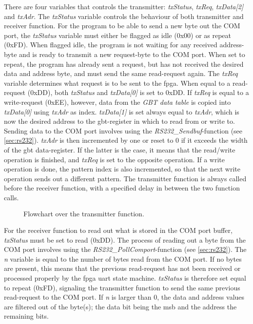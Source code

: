 \documentclass[main.tex]{subfiles}
\begin{document}
There are four variables that controls the transmitter: \textit{txStatus}, \textit{txReq}, \textit{txData[2]} and \textit{txAdr}. The \textit{txStatus} variable controls the behaviour of both transmitter and receiver function. For the program to be able to send a new byte out the COM port, the \textit{txStatus} variable must either be flagged as idle (0x00) or as repeat (0xFD). When flagged idle, the program is not waiting for any received address-byte and is ready to transmit a new request-byte to the COM port. When set to repeat, the program has already sent a request, but has not received the desired data and address byte, and must send the same read-request again. The \textit{txReq} variable determines what request is to be sent to the \gls{fpga}. When equal to a read-request (0xDD), both \textit{txStatus} and \textit{txData[0]} is set to 0xDD. If \textit{txReq} is equal to a write-request (0xEE), however, data from the \textit{GBT data table} is copied into \textit{txData[0]} using \textit{txAdr} as index. \textit{txData[1]} is set always equal to \textit{txAdr}, which is now the desired address to the \gls{gbt}-register in which to read from or write to. Sending data to the COM port involves using the \textit{RS232\_Sendbuf}-function (see \ref{sec:rs232}). \textit{txAdr} is then incremented by one or reset to 0 if it exceeds the width of the \gls{gbt} data-register. If the latter is the case, it means that the read/write operation is finished, and \textit{txReq} is set to the opposite operation. If a write operation is done, the pattern index is also incremented, so that the next write operation sends out a different pattern. The transmitter function is always called before the receiver function, with a specified delay in between the two function calls. \\

\begin{figure}[H] %
\begin{center}
\resizebox{0.8\linewidth}{!}{}
\caption{Flowchart over the transmitter function.}
\label{fig:flowtx}
\end{center}
\end{figure}

For the receiver function to read out what is stored in the COM port buffer, \textit{txStatus} must be set to read (0xDD). The process of reading out a byte from the COM port involves using the \textit{RS232\_PollComport}-function (see \ref{sec:rs232}). The \textit{n} variable is equal to the number of bytes read from the COM port. If no bytes are present, this means that the previous read-request has not been received or processed properly by the \gls{fpga} \gls{uart} state machine. \textit{txStatus} is therefore set equal to repeat (0xFD), signaling the transmitter function to send the same previous read-request to the COM port. If \textit{n} is larger than 0, the data and address values are filtered out of the byte(s); the data bit being the \gls{msb} and the address the remaining bits.
\end{document}
